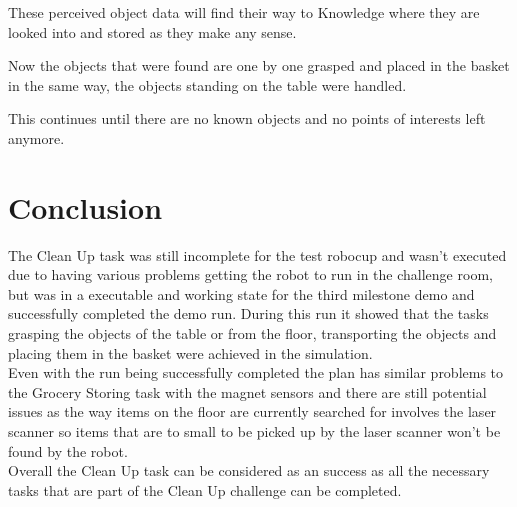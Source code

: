 \documentclass[main.tex]{subfiles}
\begin{document}
	\begin{knowledge}
	These perceived object data will find their way to Knowledge where they are looked into and stored as they make any sense.
	\end{knowledge}
    
	\begin{planning}
	Now the objects that were found are one by one grasped and placed in the basket in the same way, the objects standing on the table were handled.
	
	This continues until there are no known objects and no points of interests left anymore.
	\end{planning}
    
	\section{Conclusion}
	The Clean Up task was still incomplete for the test robocup and wasn't executed due to having various problems getting the robot to run in the challenge room, but was in a executable and working state for the third milestone demo and successfully completed the demo run. During this run it showed that the tasks grasping the objects of the table or from the floor, transporting the objects and placing them in the basket were achieved in the simulation.\\
	Even with the run being successfully completed the plan has similar problems to the Grocery Storing task with the magnet sensors and there are still potential issues as the way items on the floor are currently searched for involves the laser scanner so items that are to small to be picked up by the laser scanner won't be found by the robot.\\
	Overall the Clean Up task can be considered as an success as all the necessary tasks that are part of the Clean Up challenge can be completed. 
	
	\endgroup
\end{document}

